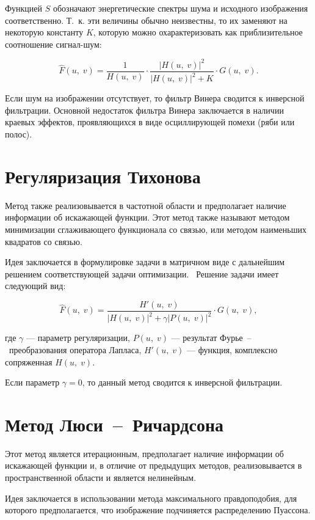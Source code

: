 Функцией $S$ обозначают энергетические спектры шума и исходного изображения соответственно. Т.~к. эти величины обычно неизвестны, то их заменяют на некоторую константу $K$, которую можно охарактеризовать как приблизительное соотношение сигнал-шум:

\begin{equation}
    \hat{F}(u,\;v) = \frac{1}{H(u,\;v)}\cdot \frac{|H(u,\;v)|^2}{|H(u,\;v)|^2 + K} \cdot G(u,\;v).
\end{equation}

Если шум на изображении отсутствует, то фильтр Винера сводится к инверсной фильтрации. Основной недостаток фильтра Винера заключается в наличии краевых эффектов, проявляющихся в виде осциллирующей помехи (ряби или полос).

\section{Регуляризация Тихонова}

Метод также реализовывается в частотной области и предполагает наличие информации об искажающей функции. Этот метод также называют методом минимизации сглаживающего функционала со связью, или методом наименьших квадратов со связью.

Идея заключается в формулировке задачи в матричном виде с дальнейшим решением соответствующей задачи оптимизации.~\cite{tihon} Решение задачи имеет следующий вид:

\begin{equation}
	\hat{F}(u,\;v) = \frac{H'(u,\;v)}{|H(u,\;v)|^2 + \gamma|P(u,\;v)|^2} \cdot G(u,\;v),
\end{equation}

где $\gamma$ --- параметр регуляризации, $P(u,\;v)$ --- результат Фурье~--~преобразования оператора Лапласа, $H'(u,\;v)$ --- функция, комплексно сопряженная $H(u,\;v)$.

Если параметр $\gamma = 0$, то данный метод сводится к инверсной фильтрации.

\section{Метод Люси~--~Ричардсона}

Этот метод является итерационным, предполагает наличие информации об искажающей функции и, в отличие от предыдущих методов, реализовывается в пространственной области и является нелинейным.~\cite{lusi} 

Идея заключается в использовании метода максимального правдоподобия, для которого предполагается, что изображение подчиняется распределению Пуассона.%

